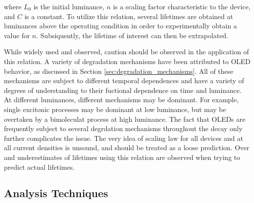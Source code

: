 \documentclass[../thesis.tex]{subfiles}
\begin{document}
where $L_0$ is the initial luminance, $n$ is a scaling factor characteristic to the device, and $C$ is a constant.
To utilize this relation, several lifetimes are obtained at luminances above the operating condition in order to experimentally obtain a value for $n$.
Subsiquently, the lifetime of interest can then be extrapolated.

While widely used and observed, caution should be observed in the application of this relation.  
A variety of degradation mechanisms have been attributed to OLED behavior, as discussed in Section \ref{sec:degradation_mechanisms}.
All of these mechanisms are subject to different temporal dependences and have a variety of degrees of understanding to their fuctional dependence on time and luminance.
At different luminances, different mechanisms may be dominant.
For example, single excitonic processes may be dominant at low luminance, but may be overtaken by a bimoleculat process at high luminance.
The fact that OLEDs are frequently subject to several degrdation mechanisms throughout the decay only further complicates the issue.
The very idea of scaling law for all devices and at all current densities is unsound, and should be treated as a loose prediction.
Over and underestimates of lifetimes using this relation are observed when trying to predict actual lifetimes.\supercite{Meerheim2006,Fry2005}


\subsection{Analysis Techniques}\label{sec:degradation_analysis}




\end{document}
